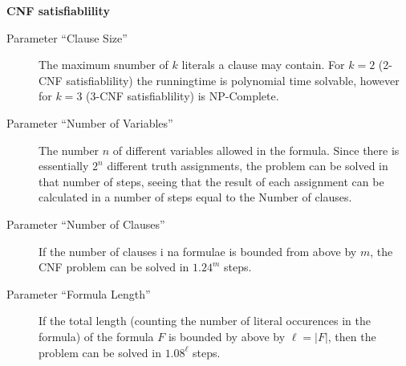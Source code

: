 \textbf{CNF satisfiablility}
\begin{description}
\item[Parameter ``Clause Size''] The maximum snumber of $k$ literals a clause
  may contain. For $k = 2$ (2-CNF satisfiablility) the runningtime is polynomial
  time solvable, however for $k = 3$ (3-CNF satisfiablility) is NP-Complete.

\item[Parameter ``Number of Variables''] The number $n$ of different variables
  allowed in the formula. Since there is essentially $2^n$ different truth
  assignments, the problem can be solved in that number of steps, seeing that
  the result of each assignment can be calculated in a number of steps equal to
  the Number of clauses.

\item[Parameter ``Number of Clauses''] If the number of clauses i na formulae is
  bounded from above by $m$, the CNF problem can be solved in $1.24^m$ steps.

\item[Parameter ``Formula Length''] If the total length (counting the number of
  literal occurences in the formula) of the formula $F$ is bounded by above by
  $\ell = |F|$, then the problem can be solved in $1.08^\ell$ steps.
\end{description}

